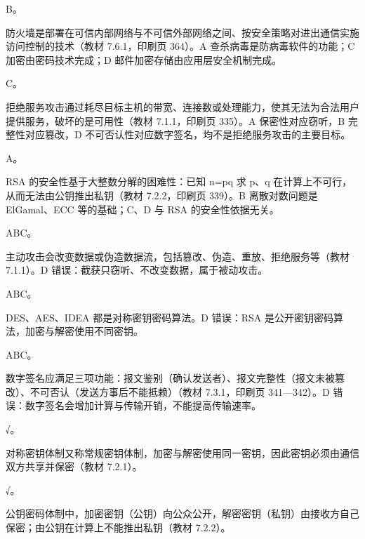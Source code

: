 \documentclass[a4paper,11pt]{article}
\begin{document}
\q B。\begin{analysis}防火墙是部署在可信内部网络与不可信外部网络之间、按安全策略对进出通信实施访问控制的技术（教材 7.6.1，印刷页 364）。A 查杀病毒是防病毒软件的功能；C 加密由密码技术完成；D 邮件加密存储由应用层安全机制完成。\end{analysis}

\q C。\begin{analysis}拒绝服务攻击通过耗尽目标主机的带宽、连接数或处理能力，使其无法为合法用户提供服务，破坏的是可用性（教材 7.1.1，印刷页 335）。A 保密性对应窃听，B 完整性对应篡改，D 不可否认性对应数字签名，均不是拒绝服务攻击的主要目标。\end{analysis}

\q A。\begin{analysis}RSA 的安全性基于大整数分解的困难性：已知 n=pq 求 p、q 在计算上不可行，从而无法由公钥推出私钥（教材 7.2.2，印刷页 339）。B 离散对数问题是 ElGamal、ECC 等的基础；C、D 与 RSA 的安全性依据无关。\end{analysis}


\q ABC。\begin{analysis}主动攻击会改变数据或伪造数据流，包括篡改、伪造、重放、拒绝服务等（教材 7.1.1）。D 错误：截获只窃听、不改变数据，属于被动攻击。\end{analysis}

\q ABC。\begin{analysis}DES、AES、IDEA 都是对称密钥密码算法。D 错误：RSA 是公开密钥密码算法，加密与解密使用不同密钥。\end{analysis}

\q ABC。\begin{analysis}数字签名应满足三项功能：报文鉴别（确认发送者）、报文完整性（报文未被篡改）、不可否认（发送方事后不能抵赖）（教材 7.3.1，印刷页 341—342）。D 错误：数字签名会增加计算与传输开销，不能提高传输速率。\end{analysis}


\q √。\begin{analysis}对称密钥体制又称常规密钥体制，加密与解密使用同一密钥，因此密钥必须由通信双方共享并保密（教材 7.2.1）。\end{analysis}

\q √。\begin{analysis}公钥密码体制中，加密密钥（公钥）向公众公开，解密密钥（私钥）由接收方自己保密；由公钥在计算上不能推出私钥（教材 7.2.2）。\end{analysis}
\end{document}
